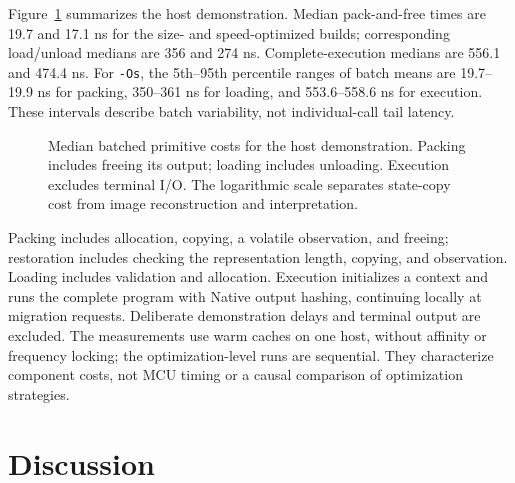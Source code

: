 \documentclass[conference,letterpaper]{IEEEtran}
\newcommand{\code}[1]{\texttt{#1}}
\begin{document}
Figure~\ref{fig:cost} summarizes the host demonstration. Median pack-and-free times are 19.7 and 17.1 ns for the size- and speed-optimized builds; corresponding load/unload medians are 356 and 274 ns. Complete-execution medians are 556.1 and 474.4 ns. For \code{-Os}, the 5th--95th percentile ranges of batch means are 19.7--19.9 ns for packing, 350--361 ns for loading, and 553.6--558.6 ns for execution. These intervals describe batch variability, not individual-call tail latency.

\begin{figure}[t]
\centering
{}
\caption{Median batched primitive costs for the host demonstration. Packing includes freeing its output; loading includes unloading. Execution excludes terminal I/O. The logarithmic scale separates state-copy cost from image reconstruction and interpretation.}
\label{fig:cost}
\end{figure}

Packing includes allocation, copying, a volatile observation, and freeing; restoration includes checking the representation length, copying, and observation. Loading includes validation and allocation. Execution initializes a context and runs the complete program with Native output hashing, continuing locally at migration requests. Deliberate demonstration delays and terminal output are excluded. The measurements use warm caches on one host, without affinity or frequency locking; the optimization-level runs are sequential. They characterize component costs, not MCU timing or a causal comparison of optimization strategies.

\section{Discussion}
\end{document}
